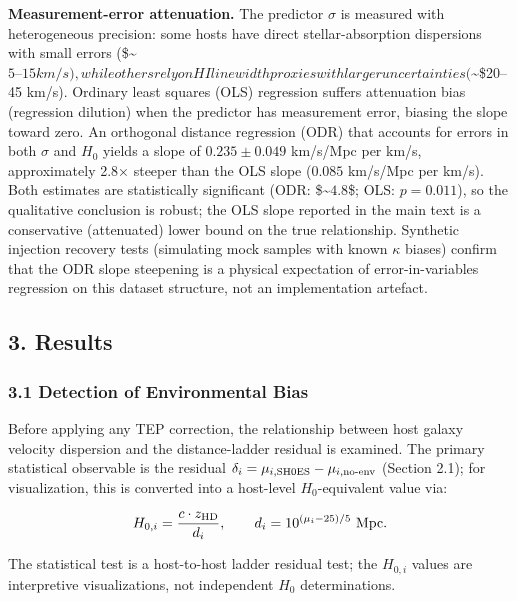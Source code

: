 \documentclass[
]{article}
\begin{document}
\textbf{Measurement-error attenuation.} The predictor \(\sigma\) is
measured with heterogeneous precision: some hosts have direct
stellar-absorption dispersions with small errors
(\$\sim\(5–15 km/s), while
others rely on HI linewidth proxies with larger uncertainties (\)\sim\$20--45
km/s). Ordinary least squares (OLS) regression suffers attenuation bias
(regression dilution) when the predictor has measurement error, biasing
the slope toward zero. An orthogonal distance regression (ODR) that
accounts for errors in both \(\sigma\) and \(H_0\) yields a slope of
\(0.235 \pm 0.049\) km/s/Mpc per km/s, approximately 2.8× steeper than
the OLS slope (\(0.085\) km/s/Mpc per km/s). Both estimates are
statistically significant (ODR: \$\sim\(4.8\)\sigma\$; OLS:
\(p=0.011\)), so the qualitative conclusion is robust; the OLS slope
reported in the main text is a conservative (attenuated) lower bound on
the true relationship. Synthetic injection recovery tests (simulating
mock samples with known \(\kappa\) biases) confirm that the ODR slope
steepening is a physical expectation of error-in-variables regression on
this dataset structure, not an implementation artefact.

\subsection{3. Results}\label{results}

\subsubsection{3.1 Detection of Environmental
Bias}\label{detection-of-environmental-bias}

Before applying any TEP correction, the relationship between host galaxy
velocity dispersion and the distance-ladder residual is examined. The
primary statistical observable is the residual
\(\delta_i = \mu_{i,\rm SH0ES} - \mu_{i,\rm no\text{-}env}\) (Section
2.1); for visualization, this is converted into a host-level
\(H_0\)-equivalent value via:

\begin{equation}
H_{0,i} = \frac{c \cdot z_{\rm HD}}{d_i},
\qquad d_i = 10^{(\mu_i - 25)/5}\ {\rm Mpc}.
\label{eq:h0_definition}
\end{equation}

The statistical test is a host-to-host ladder residual test; the
\(H_{0,i}\) values are interpretive visualizations, not independent
\(H_0\) determinations.
\end{document}
